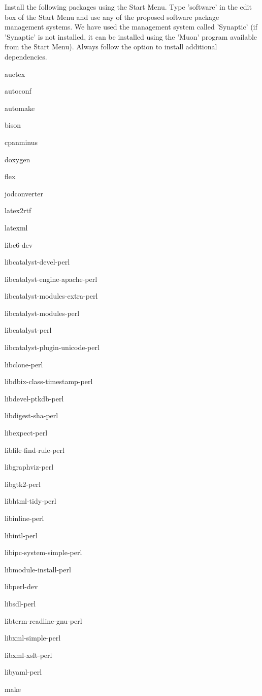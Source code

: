 \documentclass[12pt]{article}
\begin{document}
Install the following packages using the Start Menu.  Type 'software'
in the edit box of the Start Menu and use any of the proposed software
package management systems.  We have used the management system called
'Synaptic' (if 'Synaptic' is not installed, it can be installed using
the 'Muon' program available from the Start Menu).  Always follow the
option to install additional dependencies.
\begin{description} 
\item auctex
\item autoconf
\item automake
\item bison
\item cpanminus
\item doxygen
\item flex
\item jodconverter
\item latex2rtf
\item latexml 
\item libc6-dev
\item libcatalyst-devel-perl
\item libcatalyst-engine-apache-perl
\item libcatalyst-modules-extra-perl
\item libcatalyst-modules-perl
\item libcatalyst-perl

\item libcatalyst-plugin-unicode-perl

\item libclone-perl
\item libdbix-class-timestamp-perl
\item libdevel-ptkdb-perl
\item libdigest-sha-perl
\item libexpect-perl
\item libfile-find-rule-perl
\item libgraphviz-perl
\item libgtk2-perl
\item libhtml-tidy-perl
\item libinline-perl
\item libintl-perl
\item libipc-system-simple-perl
\item libmodule-install-perl
\item libperl-dev
\item libsdl-perl
\item libterm-readline-gnu-perl
\item libxml-simple-perl
\item libxml-xslt-perl
\item libyaml-perl
\item make


\end{description}
\end{document}
